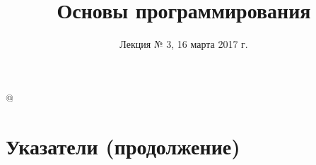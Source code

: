 %





\title{Основы программирования}
\subtitle{Лекция № 3, 16 марта 2017 г.}
\date{}




\lstMakeShortInline[style=inlineC]@

\begin{frame}[plain]
  \titlepage
\end{frame}


\section{Указатели (продолжение)}


\newcommand\memtop{1}
\newcommand\membottom{0}

\newcommand{\memline}[2]{
  \def\left{#1-0.45}
  \def\right{#2+0.45}

  \draw[byte lines] (\left,\membottom) grid (\right,\memtop);

  \foreach \y in {\membottom, \memtop}
    \draw (\left,\y) -- (\right,\y);

  \foreach \x in {\left, \right}
    \draw [decorate,decoration={snake,amplitude=0.3mm,segment length=3mm}]
      (\x,\membottom) -- (\x,\memtop);
}

\newcommand{\memblock}[3]{
  \def\left{#1}
  \def\right{#2}
  \def\blockname{#3}

  \draw [mem block,draw=none] (\left,\membottom) rectangle (\right,\memtop);
  \draw [block byte lines] (\left,\membottom) grid (\right,\memtop);
  \draw [mem block,fill=none] (\left,\membottom) rectangle (\right,\memtop)
    node [pos=0.5] (block \blockname) {};
}

\newcommand{\memaddr}[2]{
  \def\x{#1+0.5}
  \def\y{\membottom-0.5}
  \draw [-latex,shorten <=6pt] (\x,\y)
    node [fill=white,inner sep=0,outer sep=0] {\ttfamily\small #2} -- (\x,\membottom);
}

